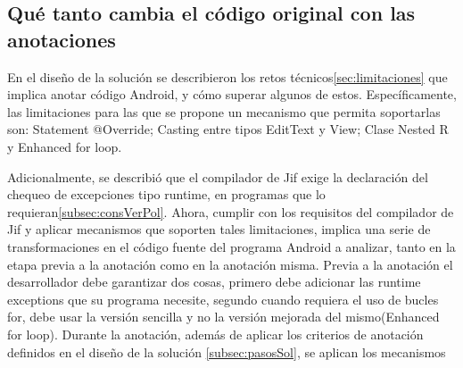 \subsection{Qué tanto cambia el código original con las anotaciones}
\label{subsec:cambios}
En el diseño de la solución se describieron los retos
técnicos\ref{sec:limitaciones} que implica anotar código Android, y cómo superar
algunos de estos. Específicamente, las limitaciones para las que se propone un
mecanismo que permita soportarlas son: Statement @Override; Casting entre tipos
EditText y View; Clase Nested R y Enhanced for loop.

% 
Adicionalmente, se describió que el compilador de Jif exige la declaración del
chequeo de excepciones tipo runtime, en programas que lo
requieran\ref{subsec:consVerPol}. Ahora, cumplir con los requisitos del
compilador de Jif y aplicar mecanismos que soporten tales limitaciones, implica
una serie de transformaciones en el código fuente del programa Android a
analizar, tanto en la etapa previa a la anotación como en la anotación
misma.\newline
Previa a la anotación el desarrollador debe garantizar dos cosas, primero debe
adicionar las runtime exceptions que su programa necesite, segundo cuando
requiera el uso de bucles for, debe usar la versión sencilla y no la versión
mejorada del mismo(Enhanced for loop).\newline 
Durante la anotación, además de aplicar los criterios de anotación definidos en
el diseño de la solución \ref{subsec:pasosSol}, se aplican los mecanismos
